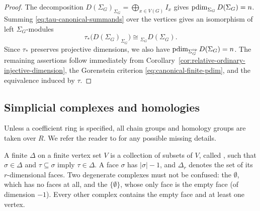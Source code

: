 \documentclass[a4paper,leqno]{amsart}
\begin{document}
\begin{proof}
The decomposition $D(\Sigma_G)_{\Sigma_G}
 =\bigoplus_{x\in V(G)}I_x$ gives $\operatorname{pdim}_{\Sigma_G}D(\Sigma_G)=n$. Summing \eqref{eq:tau-canonical-summands} over the vertices gives an isomorphism of left $\Sigma_G$-modules
\[
 \tau_*\bigl(D(\Sigma_G)_{\Sigma_G}\bigr)
 \cong{}_{\Sigma_G}D(\Sigma_G).
\]
Since $\tau_*$ preserves projective dimensions, we also have
$\operatorname{pdim}_{\Sigma_G^{\operatorname{op}}}D(\Sigma_G)=n$. 
The remaining assertions follow immediately from Corollary~\ref{cor:relative-ordinary-injective-dimension}, the Gorenstein criterion \eqref{eq:canonical-finite-pdim}, and the equivalence induced by $\tau$.
\end{proof}




\subsection{Simplicial complexes and homologies}
\label{subsec:simplicial-topology}

Unless a coefficient ring is specified, all chain groups and homology groups are taken over $R$.  We refer the reader to \cite{Mun84} for any possible missing details.

A finite  $\Delta$ on a finite vertex set $V$ is a collection of subsets of $V$, called , such that $\sigma\in\Delta$ and $\tau\subseteq\sigma$ imply $\tau\in\Delta$. A face $\sigma$ has  $|\sigma|-1$, and $\Delta_r$ denotes the set of its $r$-dimensional faces. Two degenerate complexes must not be confused: the  $\emptyset$, which has no faces at all, and the  $\{\emptyset\}$, whose only face is the empty face (of dimension $-1$). Every other complex contains the empty face and at least one vertex.
\end{document}
